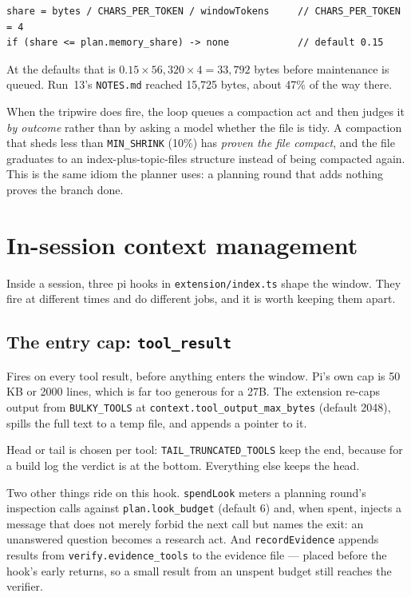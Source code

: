 \documentclass[11pt,a4paper]{article}
\newcommand{\file}[1]{\texttt{#1}}
\newcommand{\key}[1]{\texttt{#1}}
\begin{document}
\begin{lstlisting}
share = bytes / CHARS_PER_TOKEN / windowTokens     // CHARS_PER_TOKEN = 4
if (share <= plan.memory_share) -> none            // default 0.15
\end{lstlisting}

At the defaults that is $0.15 \times 56{,}320 \times 4 = 33{,}792$ bytes before
maintenance is queued. Run~13's \file{NOTES.md} reached 15{,}725 bytes, about
47\% of the way there.

When the tripwire does fire, the loop queues a compaction act and then judges it
\emph{by outcome} rather than by asking a model whether the file is tidy. A
compaction that sheds less than \texttt{MIN\_SHRINK} (10\%) has \emph{proven the
file compact}, and the file graduates to an index-plus-topic-files structure
instead of being compacted again. This is the same idiom the planner uses: a
planning round that adds nothing proves the branch done.

\section{In-session context management}

Inside a session, three pi hooks in \file{extension/index.ts} shape the window.
They fire at different times and do different jobs, and it is worth keeping them
apart.

\subsection{The entry cap: \texttt{tool\_result}}

Fires on every tool result, before anything enters the window. Pi's own cap is
50\,KB or 2000 lines, which is far too generous for a 27B. The extension
re-caps output from \texttt{BULKY\_TOOLS} at
\key{context.tool\_output\_max\_bytes} (default 2048), spills the full text to a
temp file, and appends a pointer to it.

Head or tail is chosen per tool: \texttt{TAIL\_TRUNCATED\_TOOLS} keep the end,
because for a build log the verdict is at the bottom. Everything else keeps the
head.

Two other things ride on this hook. \file{spendLook} meters a planning round's
inspection calls against \key{plan.look\_budget} (default 6) and, when spent,
injects a message that does not merely forbid the next call but names the exit:
an unanswered question becomes a research act. And \file{recordEvidence} appends
results from \key{verify.evidence\_tools} to the evidence file --- placed
before the hook's early returns, so a small result from an unspent budget still
reaches the verifier.
\end{document}
